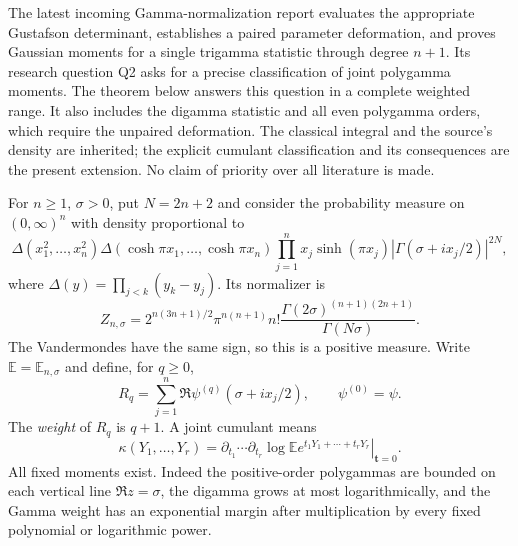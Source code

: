 \documentclass[11pt,a4paper]{article}
\numberwithin{equation}{section}
\theoremstyle{definition}
\theoremstyle{remark}
\begin{document}
The latest incoming Gamma-normalization report \cite{GammaIncoming} evaluates the appropriate
Gustafson determinant, establishes a paired parameter deformation, and
proves Gaussian moments for a single trigamma statistic through degree
$n+1$. Its research question Q2 asks for a precise classification of
joint polygamma moments. The theorem below answers this question in a
complete weighted range. It also includes the digamma statistic and all
even polygamma orders, which require the unpaired deformation.
The classical integral and the source's density are inherited; the
explicit cumulant classification and its consequences are the present
extension. No claim of priority over all literature is made.

For $n\ge1$, $\sigma>0$, put $N=2n+2$ and consider the probability
measure on $(0,\infty)^n$ with density proportional to
\begin{equation}\label{gc:density}
 \Delta(x_1^2,\ldots,x_n^2)
 \Delta(\cosh\pi x_1,\ldots,\cosh\pi x_n)
 \prod_{j=1}^n x_j\sinh(\pi x_j)
       |\Gamma(\sigma+ix_j/2)|^{2N},
\end{equation}
where $\Delta(y)=\prod_{j<k}(y_k-y_j)$. Its normalizer is
\begin{equation}\label{gc:normalizer}
 Z_{n,\sigma}
 =2^{n(3n+1)/2}\pi^{n(n+1)}n!
       \frac{\Gamma(2\sigma)^{(n+1)(2n+1)}}{\Gamma(N\sigma)}.
\end{equation}
The Vandermondes have the same sign, so this is a positive measure.
Write $\mathbb E=\mathbb E_{n,\sigma}$ and define, for $q\ge0$,
\begin{equation}\label{gc:R}
 R_q=\sum_{j=1}^n\Re\psi^{(q)}(\sigma+ix_j/2),
 \qquad \psi^{(0)}=\psi.
\end{equation}
The \emph{weight} of $R_q$ is $q+1$. A joint cumulant means
\[
 \kappa(Y_1,\ldots,Y_r)
 =\left.\partial_{t_1}\cdots\partial_{t_r}
     \log\mathbb E e^{t_1Y_1+\cdots+t_rY_r}\right|_{\mathbf t=0}.
\]
All fixed moments exist. Indeed the positive-order polygammas are bounded
on each vertical line $\Re z=\sigma$, the digamma grows at most
logarithmically, and the Gamma weight has an exponential margin after
multiplication by every fixed polynomial or logarithmic power.
\end{document}
